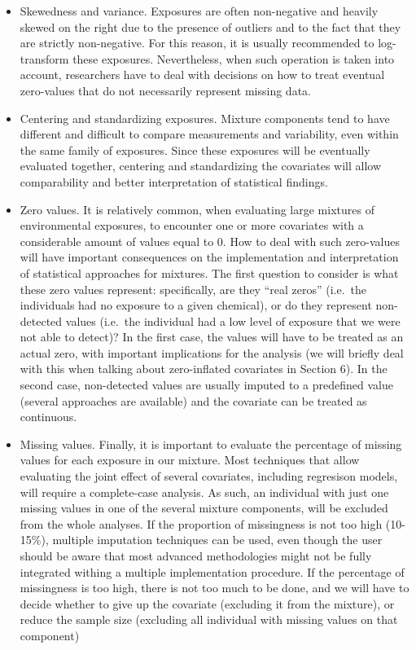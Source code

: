 \documentclass[
]{book}
\begin{document}
\begin{itemize}
\item
  Skewedness and variance. Exposures are often non-negative and heavily skewed on the right due to the presence of outliers and to the fact that they are strictly non-negative. For this reason, it is usually recommended to log-transform these exposures. Nevertheless, when such operation is taken into account, researchers have to deal with decisions on how to treat eventual zero-values that do not necessarily represent missing data.
\item
  Centering and standardizing exposures. Mixture components tend to have different and difficult to compare measurements and variability, even within the same family of exposures. Since these exposures will be eventually evaluated together, centering and standardizing the covariates will allow comparability and better interpretation of statistical findings.
\item
  Zero values. It is relatively common, when evaluating large mixtures of environmental exposures, to encounter one or more covariates with a considerable amount of values equal to 0. How to deal with such zero-values will have important consequences on the implementation and interpretation of statistical approaches for mixtures. The first question to consider is what these zero values represent: specifically, are they ``real zeros'' (i.e.~the individuals had no exposure to a given chemical), or do they represent non-detected values (i.e.~the individual had a low level of exposure that we were not able to detect)? In the first case, the values will have to be treated as an actual zero, with important implications for the analysis (we will briefly deal with this when talking about zero-inflated covariates in Section 6). In the second case, non-detected values are usually imputed to a predefined value (several approaches are available) and the covariate can be treated as continuous.
\item
  Missing values. Finally, it is important to evaluate the percentage of missing values for each exposure in our mixture. Most techniques that allow evaluating the joint effect of several covariates, including regresison models, will require a complete-case analysis. As such, an individual with just one missing values in one of the several mixture components, will be excluded from the whole analyses. If the proportion of missingness is not too high (10-15\%), multiple imputation techniques can be used, even though the user should be aware that most advanced methodologies might not be fully integrated withing a multiple implementation procedure. If the percentage of missingness is too high, there is not too much to be done, and we will have to decide whether to give up the covariate (excluding it from the mixture), or reduce the sample size (excluding all individual with missing values on that component)
\end{itemize}
\end{document}
